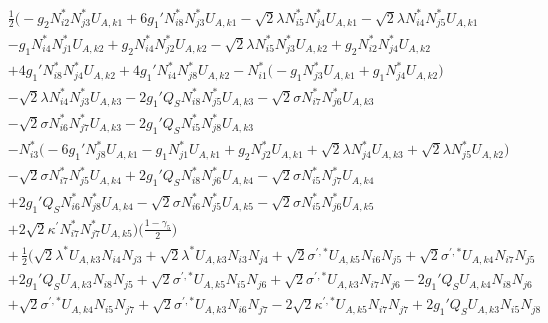 \begin{align} 
 &\frac{1}{2} \Big(- g_2 N^*_{i 2} N^*_{j 3} U_{A,{k 1}} +6 g_1' N^*_{i 8} N^*_{j 3} U_{A,{k 1}} - \sqrt{2} \lambda N^*_{i 5} N^*_{j 4} U_{A,{k 1}} - \sqrt{2} \lambda N^*_{i 4} N^*_{j 5} U_{A,{k 1}} \nonumber \\ 
 &- g_1 N^*_{i 4} N^*_{j 1} U_{A,{k 2}} +g_2 N^*_{i 4} N^*_{j 2} U_{A,{k 2}} - \sqrt{2} \lambda N^*_{i 5} N^*_{j 3} U_{A,{k 2}} +g_2 N^*_{i 2} N^*_{j 4} U_{A,{k 2}} \nonumber \\ 
 &+4 g_1' N^*_{i 8} N^*_{j 4} U_{A,{k 2}} +4 g_1' N^*_{i 4} N^*_{j 8} U_{A,{k 2}} - N^*_{i 1} \Big(- g_1 N^*_{j 3} U_{A,{k 1}}  + g_1 N^*_{j 4} U_{A,{k 2}} \Big)\nonumber \\ 
 &- \sqrt{2} \lambda N^*_{i 4} N^*_{j 3} U_{A,{k 3}} -2 g_1' Q_{S} N^*_{i 8} N^*_{j 5} U_{A,{k 3}} - \sqrt{2} \sigma N^*_{i 7} N^*_{j 6} U_{A,{k 3}} \nonumber \\ 
 &- \sqrt{2} \sigma N^*_{i 6} N^*_{j 7} U_{A,{k 3}} -2 g_1' Q_{S} N^*_{i 5} N^*_{j 8} U_{A,{k 3}} \nonumber \\ 
 &- N^*_{i 3} \Big(-6 g_1' N^*_{j 8} U_{A,{k 1}}  - g_1 N^*_{j 1} U_{A,{k 1}}  + g_2 N^*_{j 2} U_{A,{k 1}}  + \sqrt{2} \lambda N^*_{j 4} U_{A,{k 3}}  + \sqrt{2} \lambda N^*_{j 5} U_{A,{k 2}} \Big)\nonumber \\ 
 &- \sqrt{2} \sigma N^*_{i 7} N^*_{j 5} U_{A,{k 4}} +2 g_1' Q_{S} N^*_{i 8} N^*_{j 6} U_{A,{k 4}} - \sqrt{2} \sigma N^*_{i 5} N^*_{j 7} U_{A,{k 4}} \nonumber \\ 
 &+2 g_1' Q_{S} N^*_{i 6} N^*_{j 8} U_{A,{k 4}} - \sqrt{2} \sigma N^*_{i 6} N^*_{j 5} U_{A,{k 5}} - \sqrt{2} \sigma N^*_{i 5} N^*_{j 6} U_{A,{k 5}} \nonumber \\ 
 &+2 \sqrt{2} \kappa^\prime N^*_{i 7} N^*_{j 7} U_{A,{k 5}} \Big)\Big(\frac{1-\gamma_5}{2}\Big)\\ 
  & + \,\frac{1}{2} \Big(\sqrt{2} \lambda^* U_{A,{k 3}} N_{{i 4}} N_{{j 3}} +\sqrt{2} \lambda^* U_{A,{k 3}} N_{{i 3}} N_{{j 4}} +\sqrt{2} \sigma^{\prime,*} U_{A,{k 5}} N_{{i 6}} N_{{j 5}} +\sqrt{2} \sigma^{\prime,*} U_{A,{k 4}} N_{{i 7}} N_{{j 5}} \nonumber \\ 
 &+2 g_1' Q_{S} U_{A,{k 3}} N_{{i 8}} N_{{j 5}} +\sqrt{2} \sigma^{\prime,*} U_{A,{k 5}} N_{{i 5}} N_{{j 6}} +\sqrt{2} \sigma^{\prime,*} U_{A,{k 3}} N_{{i 7}} N_{{j 6}} -2 g_1' Q_{S} U_{A,{k 4}} N_{{i 8}} N_{{j 6}} \nonumber \\ 
 &+\sqrt{2} \sigma^{\prime,*} U_{A,{k 4}} N_{{i 5}} N_{{j 7}} +\sqrt{2} \sigma^{\prime,*} U_{A,{k 3}} N_{{i 6}} N_{{j 7}} -2 \sqrt{2} \kappa^{\prime,*} U_{A,{k 5}} N_{{i 7}} N_{{j 7}} +2 g_1' Q_{S} U_{A,{k 3}} N_{{i 5}} N_{{j 8}} \nonumber \\ 

\end{align}
